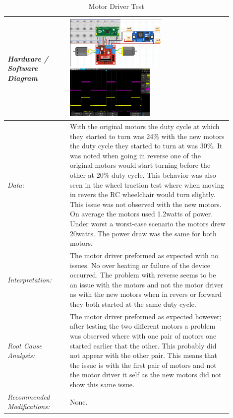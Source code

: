 \documentclass[conference]{IEEEtran}
\begin{document}
\begin{table}[!ht]
\begin{tabular}{|>{\columncolor{black!5}}p{0.25\linewidth}|>{}p{0.65\linewidth}|}
            \textit{Hardware / Software Diagram} & \includegraphics[keepaspectratio, height=1in]{figs/F/motor_driver_fritzing.png} \includegraphics[keepaspectratio, height=1in]{figs/paper/good_motors.png} 

            \\ \hline

            \textit{Data:} & With the original motors the duty cycle at which they started to turn was 24\% with the new motors the duty cycle they started to turn at was 30\%. It was noted when going in reverse one of the original motors would start turning before the other at 20\% duty cycle. This behavior was also seen in the wheel traction test where when moving in revers the RC wheelchair would turn slightly. This issue was not observed with the new motors. On average the motors used 1.2watts of power. Under worst a worst-case scenario the motors drew 20watts. The power draw was the same for both motors.  

            \\ \hline 

            \textit{Interpretation:} & The motor driver preformed as expected with no issues. No over heating or failure of the device occurred. The problem with reverse seems to be an issue with the motors and not the motor driver as with the new motors when in revers or forward they both started at the same duty cycle.  

            \\ \hline

            \textit{Root Cause Analysis: } & The motor driver preformed as expected however; after testing the two different motors a problem was observed where with one pair of motors one started earlier that the other. This probably did not appear with the other pair. This means that the issue is with the first pair of motors and not the motor driver it self as the new motors did not show this same issue. 

            \\ \hline

            \textit{Recommended Modifications: } & None.  

            \\ \hline

        \end{tabular}           
        \caption{Motor Driver Test}
        \label{tab:motor_driver_test}
    \end{table}
\end{document}
